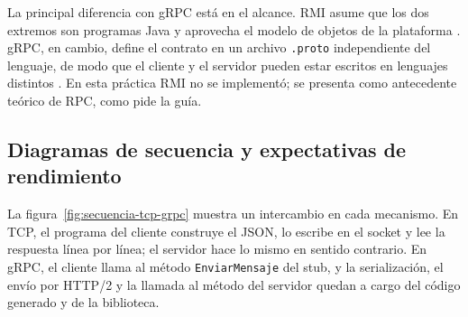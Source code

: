La principal diferencia con gRPC está en el alcance. RMI asume que los dos extremos son programas Java y aprovecha el modelo de objetos de la plataforma \cite{oracle2023rmi}. gRPC, en cambio, define el contrato en un archivo \texttt{.proto} independiente del lenguaje, de modo que el cliente y el servidor pueden estar escritos en lenguajes distintos \cite{grpcIntro}. En esta práctica RMI no se implementó; se presenta como antecedente teórico de RPC, como pide la guía.

\subsection{Diagramas de secuencia y expectativas de rendimiento}

La figura~\ref{fig:secuencia-tcp-grpc} muestra un intercambio en cada mecanismo. En TCP, el programa del cliente construye el JSON, lo escribe en el socket y lee la respuesta línea por línea; el servidor hace lo mismo en sentido contrario. En gRPC, el cliente llama al método \texttt{EnviarMensaje} del stub, y la serialización, el envío por HTTP/2 y la llamada al método del servidor quedan a cargo del código generado y de la biblioteca.

